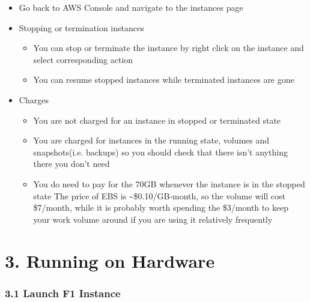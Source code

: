 \documentclass[]{article}
\begin{document}
\begin{itemize}
\item
  Go back to AWS Console and navigate to the instances page
\item
  Stopping or termination instances

  \begin{itemize}
  \item
    You can stop or terminate the instance by right click on the
    instance and select corresponding action
  \item
    You can resume stopped instances while terminated instances are gone
  \end{itemize}
\item
  Charges

  \begin{itemize}
  \item
    You are not charged for an instance in stopped or terminated state
  \item
    You are charged for instances in the running state, volumes and
    snapshots(i.e. backups) so you should check that there isn't
    anything there you don't need
  \item
    You do need to pay for the 70GB whenever the instance is in the
    stopped state The price of EBS is \textasciitilde{}\$0.10/GB-month,
    so the volume will cost \$7/month, while it is probably worth
    spending the \$3/month to keep your work volume around if you are
    using it relatively frequently
  \end{itemize}
\end{itemize}

\hypertarget{header-n404}{%
\section{3. Running on Hardware}\label{header-n404}}

\hypertarget{header-n419}{%
\subsubsection{3.1 Launch F1 Instance}\label{header-n419}}
\end{document}
